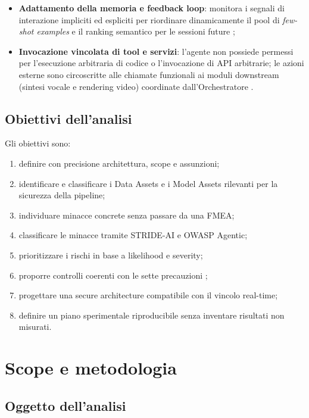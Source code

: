 \documentclass[11pt,a4paper]{article}
\begin{document}
\begin{itemize}
    \item \textbf{Adattamento della memoria e feedback loop}: monitora i segnali di interazione impliciti ed espliciti per riordinare dinamicamente il pool di \emph{few-shot examples} e il ranking semantico per le sessioni future \cite{projectspec};
    \item \textbf{Invocazione vincolata di tool e servizi}: l'agente non possiede permessi per l'esecuzione arbitraria di codice o l'invocazione di API arbitrarie; le azioni esterne sono circoscritte alle chiamate funzionali ai moduli downstream (sintesi vocale e rendering video) coordinate dall'Orchestratore \cite{projectspec,damianiasset}.  
\end{itemize}

\subsection{Obiettivi dell'analisi}

Gli obiettivi sono:

\begin{enumerate}
  \item definire con precisione architettura, scope e assunzioni;
  \item identificare e classificare i Data Assets e i Model Assets rilevanti per la sicurezza della pipeline;
  \item individuare minacce concrete senza passare da una FMEA;
  \item classificare le minacce tramite STRIDE-AI e OWASP Agentic;
  \item prioritizzare i rischi in base a likelihood e severity;
  \item proporre controlli coerenti con le sette precauzioni \cite{damianiagentic};
  \item progettare una secure architecture compatibile con il vincolo real-time;
  \item definire un piano sperimentale riproducibile senza inventare risultati non misurati.
\end{enumerate}


\section{Scope e metodologia}

\subsection{Oggetto dell'analisi}
\end{document}
